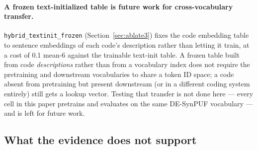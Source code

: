 \documentclass[11pt,a4paper]{article}
\newcommand{\code}[1]{\texttt{\small #1}}
\begin{document}
\paragraph{A frozen text-initialized table is future work for cross-vocabulary
transfer.} \code{hybrid\_textinit\_frozen} (Section~\ref{sec:ablate3}) fixes
the code embedding table to sentence embeddings of each code's description
rather than letting it train, at a cost of 0.1 mean-6 against the trainable
text-init table. A frozen table built from code \emph{descriptions} rather
than from a vocabulary index does not require the pretraining and downstream
vocabularies to share a token ID space; a code absent from pretraining but
present downstream (or in a different coding system entirely) still gets a
lookup vector. Testing that transfer is not done here --- every cell in this
paper pretrains and evaluates on the same DE-SynPUF vocabulary --- and is
left for future work.

\subsection{What the evidence does not support}
\end{document}
